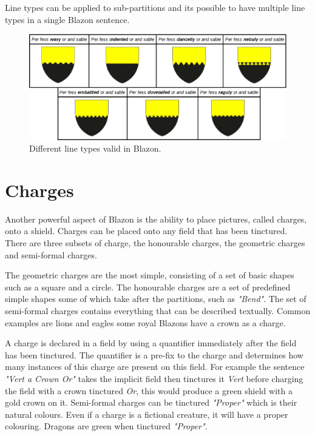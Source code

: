 Line types can be applied to sub-partitions and its possible to have multiple line types in a single Blazon sentence. 

\begin{figure}[H]
  \centering
    \includegraphics[width=\textwidth]{Blazon/images/linetypes.eps}
  \caption{Different line types valid in Blazon.\cite{linetypes}}
  \label{fig:lines}
  
\end{figure}


\section{Charges}
Another powerful aspect of Blazon is the ability to place pictures, called charges, onto a shield.  Charges can be placed onto any field that has been tinctured.  There are three subsets of charge, the honourable charges, the geometric charges and semi-formal charges.

The geometric charges are the most simple, consisting of a set of basic shapes such as a square and a circle.  The honourable charges are a set of predefined simple shapes some of which take after the partitions, such as \emph{"Bend"}.  The set of semi-formal charges contains everything that can be described textually.  Common examples are lions and eagles some royal Blazons have a crown as a charge. 


A charge is declared in a field by using a quantifier immediately after the field has been tinctured.  The quantifier is a pre-fix to the charge and determines how many instances of this charge are present on this field.  For example the sentence \emph{"Vert a Crown Or"} takes the implicit field then tinctures it \emph{Vert} before charging the field with a crown tinctured \emph{Or}, this would produce a green shield with a gold crown on it. Semi-formal charges can be tinctured \emph{"Proper"} which is their natural colours.  Even if a charge is a fictional creature, it will have a proper colouring.  Dragons are green when tinctured \emph{"Proper"}. 

